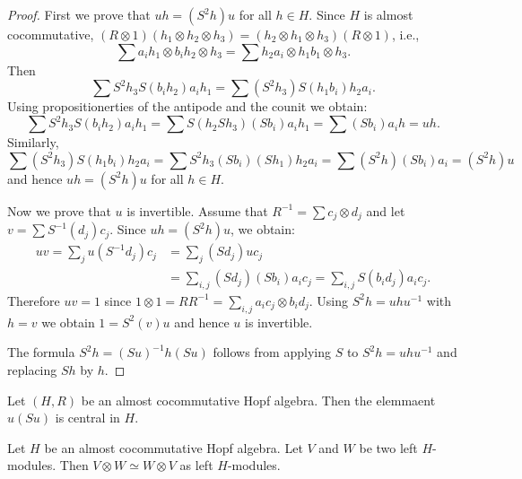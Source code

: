 \begin{proof}
First we prove that $uh=(S^2h)u$ for all $h\in H$. Since $H$ is almost cocommutative, 
$(R\otimes1)(h_1\otimes h_2\otimes h_3)=(h_2\otimes h_1\otimes h_3)(R\otimes1)$, i.e.,
\[
\sum a_ih_1\otimes b_ih_2\otimes h_3=\sum h_2a_i\otimes h_1b_1\otimes h_3.
\]
Then
\[
\sum S^2h_3S(b_ih_2)a_ih_1=\sum (S^2h_3)S(h_1b_i)h_2a_i.
\]
Using propositionerties of the antipode and the counit we obtain: 
\[
\sum S^2h_3S(b_ih_2)a_ih_1=\sum S(h_2Sh_3)(Sb_i)a_ih_1= \sum (Sb_i)a_ih=uh.
\]
Similarly, 
\[
\sum (S^2h_3)S(h_1b_i)h_2a_i=\sum S^2h_3(Sb_i)(Sh_1)h_2a_i=\sum (S^2h)(Sb_i)a_i=(S^2h)u
\]
and hence $uh=(S^2h)u$ for all $h\in H$.

Now we prove that $u$ is invertible. Assume that $R^{-1}=\sum c_j\otimes d_j$ and
let $v=\sum S^{-1}(d_j)c_j$. Since $uh=(S^2h)u$, we obtain: 
\begin{align*}
uv=\sum_j u(S^{-1}d_j)c_j&=\sum_j (Sd_j)uc_j\\
&=\sum_{i,j} (Sd_j)(Sb_i)a_ic_j=\sum_{i,j} S(b_id_j)a_ic_j.
\end{align*}
Therefore $uv=1$ since $1\otimes1=RR^{-1}=\sum_{i,j}a_ic_j\otimes b_id_j$.
Using $S^2h=uhu^{-1}$ with $h=v$ we obtain $1=S^2(v)u$ and hence $u$ is
invertible. 

The formula $S^2h=(Su)^{-1}h(Su)$ follows from applying $S$ to
$S^2h=uhu^{-1}$ and replacing $Sh$ by $h$.
\end{proof}

\begin{corollary}
Let $(H,R)$ be an almost cocommutative Hopf algebra. Then the elemmaent $u(Su)$
is central in $H$.
\end{corollary}

\begin{exercise}
\label{exercise:VW=WV}
Let $H$ be an almost cocommutative Hopf algebra. Let $V$ and $W$ be two left
$H$-modules.  Then $V\otimes W\simeq W\otimes V$ as left $H$-modules.
\end{exercise}

